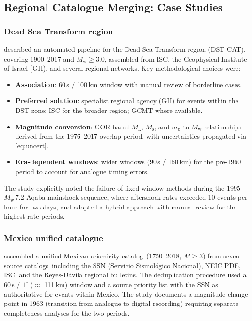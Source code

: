 \documentclass[12pt]{article}
\newcommand{\catalog}{catalog}
\newcommand{\catalogs}{catalogs}
\begin{document}
\subsection{Regional Catalogue Merging: Case Studies}
\label{sec:casestudies}

\subsubsection{Dead Sea Transform region}

\citet{DeadSea2022} described an automated pipeline for the Dead Sea Transform
region (DST-CAT), covering 1900--2017 and $M_\mathrm{w} \geq 3.0$, assembled
from ISC, the Geophysical Institute of Israel (GII), and several regional
networks.  Key methodological choices were:

\begin{itemize}
  \item \textbf{Association}: 60\,s / 100\,km window with manual review of
        borderline cases.
  \item \textbf{Preferred solution}: specialist regional agency (GII) for
        events within the DST zone; ISC for the broader region; GCMT where
        available.
  \item \textbf{Magnitude conversion}: GOR-based $M_\mathrm{L}$, $M_\mathrm{s}$,
        and $m_\mathrm{b}$ to $M_\mathrm{w}$ relationships derived from the
        1976--2017 overlap period, with uncertainties propagated via
        \eqref{eq:uncert}.
  \item \textbf{Era-dependent windows}: wider windows (90\,s / 150\,km) for
        the pre-1960 period to account for analogue timing errors.
\end{itemize}

The study explicitly noted the failure of fixed-window methods during the 1995
$M_\mathrm{w}$\,7.2 Aqaba mainshock sequence, where aftershock rates exceeded
10 events per hour for two days, and adopted a hybrid approach with manual
review for the highest-rate periods.

\subsubsection{Mexico unified catalogue}

\citet{Zuniga2019} assembled a unified Mexican seismicity \catalog\
(1750--2018, $M \geq 3$) from seven source \catalogs\ including the SSN
(Servicio Sismológico Nacional), NEIC PDE, ISC, and the Reyes-Dávila regional
bulletins.  The deduplication procedure used a 60\,s / $1^\circ$ ($\approx$
111\,km) window and a source priority list with the SSN as authoritative for
events within Mexico.  The study documents a magnitude change point in 1963
(transition from analogue to digital recording) requiring separate
completeness analyses for the two periods.
\end{document}
